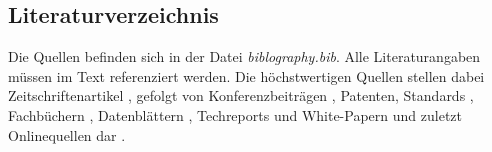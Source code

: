 \documentclass[conference]{IEEEtran}
\begin{document}
\subsection{Literaturverzeichnis}
Die Quellen befinden sich in der Datei \textit{biblography.bib}. 
Alle Literaturangaben müssen im Text referenziert werden. Die höchstwertigen Quellen stellen dabei Zeitschriftenartikel \cite{50years}, gefolgt von Konferenzbeiträgen \cite{ArmManual}, Patenten\cite{hennessy2012computer}, Standards \cite{WisconsinMadison2016}, Fachbüchern \cite{drechsler2020enhanced},  Datenblättern \cite{Asanovic2016}, Techreports und White-Papern \cite{IEEE2018} und zuletzt Onlinequellen \cite{Dirvin2019} dar \cite{Bandic2019}.



\end{document}
